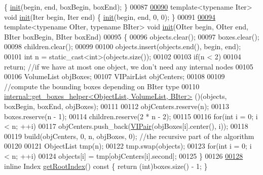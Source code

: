 \begin{DoxyCode}
       \{ \hyperlink{structinit}{init}(begin, end, boxBegin, boxEnd); \}
00087 
\hyperlink{class_eigen_1_1_kd_b_v_h_a431eed3c2567a854fb350f0b327d3307}{00090}   \textcolor{keyword}{template}<\textcolor{keyword}{typename} Iter> \textcolor{keywordtype}{void} \hyperlink{class_eigen_1_1_kd_b_v_h_a431eed3c2567a854fb350f0b327d3307}{init}(Iter begin, Iter end) \{ \hyperlink{class_eigen_1_1_kd_b_v_h_a431eed3c2567a854fb350f0b327d3307}{init}(begin, end, 0, 0); \}
00091 
\hyperlink{class_eigen_1_1_kd_b_v_h_a10a9c8f6d596d7a2cd285a3fb3e8c053}{00094}   \textcolor{keyword}{template}<\textcolor{keyword}{typename} OIter, \textcolor{keyword}{typename} BIter> \textcolor{keywordtype}{void} \hyperlink{class_eigen_1_1_kd_b_v_h_a10a9c8f6d596d7a2cd285a3fb3e8c053}{init}(OIter begin, OIter end, BIter boxBegin, BIter 
      boxEnd)
00095   \{
00096     objects.clear();
00097     boxes.clear();
00098     children.clear();
00099 
00100     objects.insert(objects.end(), begin, end);
00101     \textcolor{keywordtype}{int} n = \textcolor{keyword}{static\_cast<}\textcolor{keywordtype}{int}\textcolor{keyword}{>}(objects.size());
00102 
00103     \textcolor{keywordflow}{if}(n < 2)
00104       \textcolor{keywordflow}{return}; \textcolor{comment}{//if we have at most one object, we don't need any internal nodes}
00105 
00106     VolumeList objBoxes;
00107     VIPairList objCenters;
00108 
00109     \textcolor{comment}{//compute the bounding boxes depending on BIter type}
00110     \hyperlink{struct_eigen_1_1internal_1_1get__boxes__helper}{internal::get\_boxes\_helper<ObjectList, VolumeList, BIter>}
      ()(objects, boxBegin, boxEnd, objBoxes);
00111 
00112     objCenters.reserve(n);
00113     boxes.reserve(n - 1);
00114     children.reserve(2 * n - 2);
00115 
00116     \textcolor{keywordflow}{for}(\textcolor{keywordtype}{int} i = 0; i < n; ++i)
00117       objCenters.push\_back(\hyperlink{struct_eigen_1_1internal_1_1vector__int__pair}{VIPair}(objBoxes[i].center(), i));
00118 
00119     build(objCenters, 0, n, objBoxes, 0); \textcolor{comment}{//the recursive part of the algorithm}
00120 
00121     ObjectList tmp(n);
00122     tmp.swap(objects);
00123     \textcolor{keywordflow}{for}(\textcolor{keywordtype}{int} i = 0; i < n; ++i)
00124       objects[i] = tmp[objCenters[i].second];
00125   \}
00126 
\hyperlink{class_eigen_1_1_kd_b_v_h_a8111486ece7980dd8f0d10aff9693d11}{00128}   \textcolor{keyword}{inline} Index \hyperlink{class_eigen_1_1_kd_b_v_h_a8111486ece7980dd8f0d10aff9693d11}{getRootIndex}()\textcolor{keyword}{ const }\{ \textcolor{keywordflow}{return} (\textcolor{keywordtype}{int})boxes.size() - 1; \}

\end{DoxyCode}

